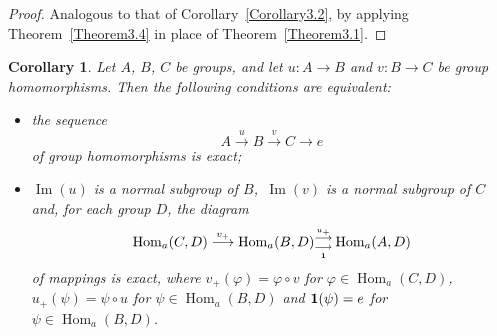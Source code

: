 \documentclass[12pt]{amsart}
\theoremstyle{theorem}
\newtheorem{corollary}[theorem]{Corollary}
\theoremstyle{definition}
\theoremstyle{remark} \theoremstyle{question} \theoremstyle{example}
\def\vr{{\varphi}}
\def\Hom{\operatorname{{Hom}}}
\def\mI{\operatorname{{Im}}}
\begin{document}
\begin{proof}
Analogous to that of Corollary~\ref{Corollary3.2}, by applying
Theorem~\ref{Theorem3.4} in place of Theorem~\ref{Theorem3.1}.
\end{proof}

\begin{corollary}\label{Corollary3.7}
Let $A$, $B$, $C$ be groups, and let $u\colon A \to B$ and $v\colon B \to C$
be group homomorphisms. Then the following conditions are equivalent:

\begin{itemize}

\item[\rm (a)] the sequence
  $$
  A \overset{u}{\longrightarrow} B \overset{v}{\longrightarrow} C \longrightarrow e
  $$
  of group homomorphisms is exact;

\item[\rm (b)] $\mI(u)$ is a normal subgroup of $B$,\, $\mI(v)$ is a normal
  subgroup of $C$ and, for each group $D$, the diagram
  $$
  \Hom_a(C,D) \overset{v_+}{\longrightarrow} \Hom_a(B,D){}^{\overset{u_+}{\longrightarrow}}_{\underset{\bf 1}{\longrightarrow}} \Hom_a(A,D)
  $$
  of mappings is exact, where  $v_+(\vr) = \vr \circ v$ for
  $\vr \in \Hom_a(C,D)$, $u_+(\psi) = \psi\circ u$ for $\psi \in \Hom_a(B,D)$
  and ${\bf 1}(\psi)=e$ for $\psi \in \Hom_a(B,D)$.

\end{itemize}
\end{corollary}
\end{document}

